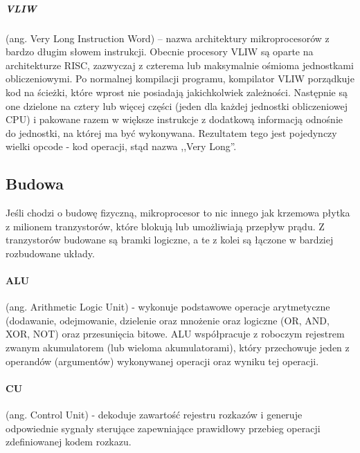 \documentclass[a4paper,twoside]{report}
\begin{document}
\subparagraph{VLIW} (ang. Very Long Instruction Word) – nazwa architektury mikroprocesorów z bardzo długim słowem instrukcji. Obecnie procesory VLIW są oparte na architekturze RISC, zazwyczaj z czterema lub maksymalnie ośmioma jednostkami obliczeniowymi. Po normalnej kompilacji programu, kompilator VLIW porządkuje kod na ścieżki, które wprost nie posiadają jakichkolwiek zależności. Następnie są one dzielone na cztery lub więcej części (jeden dla każdej jednostki obliczeniowej CPU) i pakowane razem w większe instrukcje z dodatkową informacją odnośnie do jednostki, na której ma być wykonywana. Rezultatem tego jest pojedynczy wielki opcode - kod operacji, stąd nazwa ,,Very Long''.

\subsection{Budowa}
Jeśli chodzi o budowę fizyczną, mikroprocesor to nic innego jak krzemowa płytka z milionem tranzystorów, które blokują lub umożliwiają przepływ prądu. Z tranzystorów budowane są bramki logiczne, a te z kolei są łączone w bardziej rozbudowane układy.

\paragraph{ALU} (ang. Arithmetic Logic Unit) - wykonuje podstawowe operacje arytmetyczne (dodawanie, odejmowanie, dzielenie oraz mnożenie oraz logiczne (OR, AND, XOR, NOT) oraz przesunięcia bitowe. ALU współpracuje z roboczym rejestrem zwanym akumulatorem (lub wieloma akumulatorami), który przechowuje jeden z operandów (argumentów) wykonywanej operacji oraz wyniku tej operacji.

\paragraph{CU} (ang. Control Unit) - dekoduje zawartość rejestru rozkazów i generuje odpowiednie sygnały sterujące zapewniające prawidłowy przebieg operacji zdefiniowanej kodem rozkazu.
\end{document}
